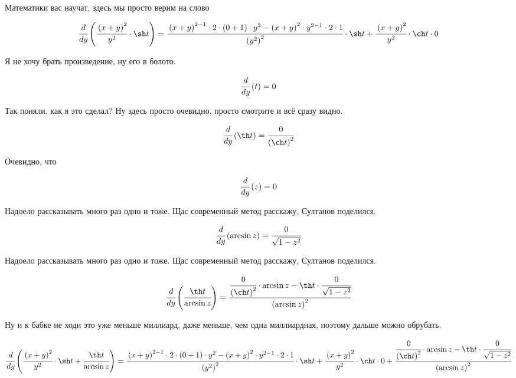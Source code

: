 Математики вас научат, здесь мы просто верим на слово


\begin{dmath}
 \cfrac{d}{d y} \left( \cfrac{\left(x + y\right)^{2}}{y^{2}} \cdot \sh t \right) = \cfrac{\left(x + y\right)^{2 - 1} \cdot 2 \cdot \left(0 + 1\right) \cdot y^{2} - \left(x + y\right)^{2} \cdot y^{2 - 1} \cdot 2 \cdot 1}{\left(y^{2}\right)^{2}} \cdot \sh t + \cfrac{\left(x + y\right)^{2}}{y^{2}} \cdot \ch t \cdot 0 
\end{dmath}


Я не хочу брать произведение, ну его в болото.


\begin{dmath}
 \cfrac{d}{d y} \left( t \right) = 0 
\end{dmath}


Так поняли, как я это сделал? Ну здесь просто очевидно, просто смотрите и всё сразу видно.


\begin{dmath}
 \cfrac{d}{d y} \left( \th t \right) = \cfrac{0}{\left(\ch t\right)^{2}} 
\end{dmath}


Очевидно, что 


\begin{dmath}
 \cfrac{d}{d y} \left( z \right) = 0 
\end{dmath}


Надоело рассказывать много раз одно и тоже. Щас современный метод расскажу, Султанов поделился.


\begin{dmath}
 \cfrac{d}{d y} \left( \arcsin z \right) = \cfrac{0}{\sqrt{  1 - z^{2}}} 
\end{dmath}


Надоело рассказывать много раз одно и тоже. Щас современный метод расскажу, Султанов поделился.


\begin{dmath}
 \cfrac{d}{d y} \left( \cfrac{\th t}{\arcsin z} \right) = \cfrac{\cfrac{0}{\left(\ch t\right)^{2}} \cdot \arcsin z - \th t \cdot \cfrac{0}{\sqrt{  1 - z^{2}}}}{\left(\arcsin z\right)^{2}} 
\end{dmath}


Ну и к бабке не ходи это уже меньше миллиард, даже меньше, чем одна миллиардная, поэтому дальше можно обрубать.


\begin{dmath}
 \cfrac{d}{d y} \left( \cfrac{\left(x + y\right)^{2}}{y^{2}} \cdot \sh t + \cfrac{\th t}{\arcsin z} \right) = \cfrac{\left(x + y\right)^{2 - 1} \cdot 2 \cdot \left(0 + 1\right) \cdot y^{2} - \left(x + y\right)^{2} \cdot y^{2 - 1} \cdot 2 \cdot 1}{\left(y^{2}\right)^{2}} \cdot \sh t + \cfrac{\left(x + y\right)^{2}}{y^{2}} \cdot \ch t \cdot 0 + \cfrac{\cfrac{0}{\left(\ch t\right)^{2}} \cdot \arcsin z - \th t \cdot \cfrac{0}{\sqrt{  1 - z^{2}}}}{\left(\arcsin z\right)^{2}} 
\end{dmath}


